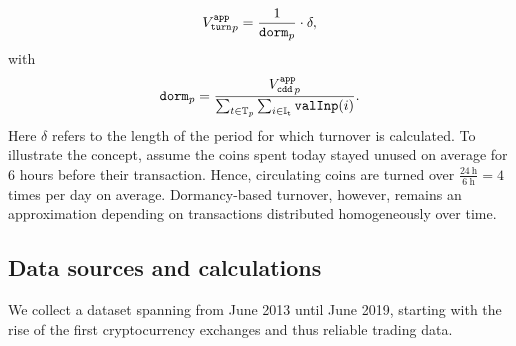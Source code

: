 \begin{align}%
  \TurnP = \frac{1}{\DormP} \cdot  \delta,%
\end{align}%
with%
\begin{align}%
  \DormP = \frac{\BddP}{\sum_{t\in\TxP} \sum_{i\in\InpT} \valI(i)}.%
\end{align}%
Here $\delta$ refers to the length of the period for which turnover is
calculated.  %
To illustrate the concept, assume the coins spent today stayed unused on
average for 6 hours before their transaction.  %
Hence, circulating coins are turned over
$\frac{\SI{24}{\hour}}{\SI{6}{\hour}} = 4$ times per day on average.  %
Dormancy-based turnover, however, remains an approximation depending on
transactions distributed homogeneously over time.  %
\renewcommand{\labelGlo}    {\label{fig:globfigComponents}}%
\renewcommand{\captionLocL} {Components of velocity measures.}%
\renewcommand{\captionLocR} {Correlations between the measures and price.}%
\renewcommand{\labelLocL}   {\label{fig:subfigComponentsPlot}}%
\renewcommand{\labelLocR}   {\label{fig:subfigComponentsCorr}}%
%
\renewcommand{\captionGlo}  {Time series plots for proxy-variables.}%
\renewcommand{\labelGlo}    {\label{fig:globfigApp}}%
\renewcommand{\captionLocL} {Normalized variables of volatility approximation.}%
\renewcommand{\captionLocR} {Standardized variables of volatility approximation.}%
\renewcommand{\labelLocL}   {\label{fig:subfigAppNorm}}%
\renewcommand{\labelLocR}   {\label{fig:subfigAppStand}}%
%

\subsection{Data sources and calculations}%
\label{sec:results:sub:comp}%

We collect a dataset spanning from June 2013 until June 2019, starting with
the rise of the first cryptocurrency exchanges and thus reliable trading
data. %

